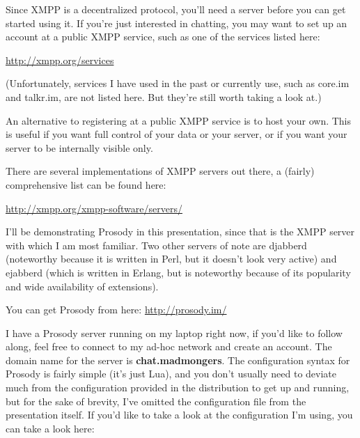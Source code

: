 Since XMPP is a decentralized protocol, you'll need a server before you can get started using it.
If you're just interested in chatting, you may want to set up an account at a public XMPP service,
such as one of the services listed here:

\url{http://xmpp.org/services}

(Unfortunately, services I have used in the past or currently use, such as core.im and talkr.im, are
not listed here.  But they're still worth taking a look at.)

An alternative to registering at a public XMPP service is to host your own.  This is useful if you want
full control of your data or your server, or if you want your server to be internally visible only.

There are several implementations of XMPP servers out there, a (fairly) comprehensive list can be found
here:

\url{http://xmpp.org/xmpp-software/servers/}

I'll be demonstrating Prosody in this presentation, since that is the XMPP server with which I am most
familiar.  Two other servers of note are djabberd (noteworthy because it is written in Perl, but it
doesn't look very active) and ejabberd (which is written in Erlang, but is noteworthy because of its
popularity and wide availability of extensions).

You can get Prosody from here: \url{http://prosody.im/}

I have a Prosody server running on my laptop right now, if you'd like to follow along, feel free to connect to my ad-hoc
network and create an account.  The domain name for the server is \textbf{chat.madmongers}.  The configuration syntax for Prosody is
fairly simple (it's just Lua), and you don't usually need to deviate much from the configuration provided in the distribution to
get up and running, but for the sake of brevity, I've omitted the configuration file from the presentation itself.  If you'd
like to take a look at the configuration I'm using, you can take a look here:

